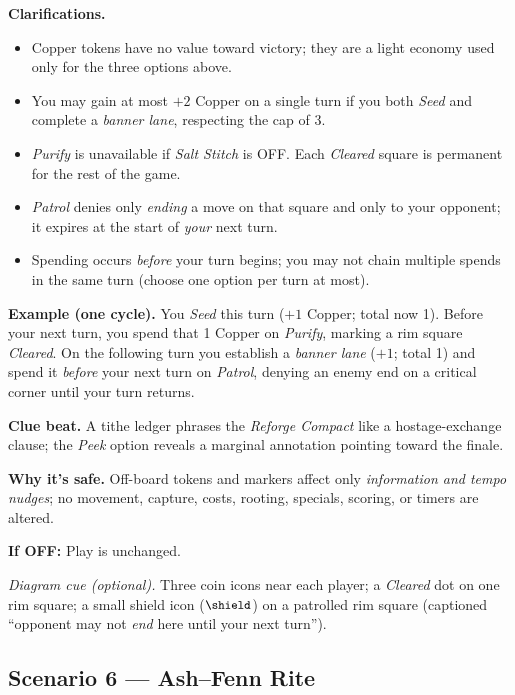 \documentclass[11pt]{article}
\numberwithin{equation}{section} %
\theoremstyle{plain} %
\theoremstyle{definition} %
\theoremstyle{remark} %
\begin{document}
\medskip
\noindent\textbf{Clarifications.}
\begin{itemize}\setlength\itemsep{0.25em}
  \item Copper tokens have no value toward victory; they are a light economy used only for the three options above.
  \item You may gain at most \(+2\) Copper on a single turn if you both \emph{Seed} and complete a \emph{banner lane}, respecting the cap of 3.
  \item \textit{Purify} is unavailable if \emph{Salt Stitch} is \textsc{OFF}. Each \emph{Cleared} square is permanent for the rest of the game.
  \item \textit{Patrol} denies only \emph{ending} a move on that square and only to your opponent; it expires at the start of \emph{your} next turn.
  \item Spending occurs \emph{before} your turn begins; you may not chain multiple spends in the same turn (choose one option per turn at most).
\end{itemize}

\medskip
\noindent\textbf{Example (one cycle).}  
You \emph{Seed} this turn (\(+1\) Copper; total now 1). Before your next turn, you spend that 1 Copper on \emph{Purify}, marking a rim square \emph{Cleared}. On the following turn you establish a \emph{banner lane} (\(+1\); total 1) and spend it \emph{before} your next turn on \emph{Patrol}, denying an enemy end on a critical corner until your turn returns.

\medskip
\noindent\textbf{Clue beat.} A tithe ledger phrases the \emph{Reforge Compact} like a hostage-exchange clause; the \emph{Peek} option reveals a marginal annotation pointing toward the finale.

\medskip
\noindent\textbf{Why it’s safe.} Off-board tokens and markers affect only \emph{information and tempo nudges}; no movement, capture, costs, rooting, specials, scoring, or timers are altered.

\medskip
\noindent\textbf{If \textsc{OFF}:} Play is unchanged.

\medskip
\noindent\textit{Diagram cue (optional).} Three coin icons near each player; a \emph{Cleared} dot on one rim square; a small shield icon (\(\small\shield\)) on a patrolled rim square (captioned “opponent may not \emph{end} here until your next turn”).

\subsection{Scenario 6 — Ash–Fenn Rite}
\label{scen:ash-fenn-rite}
\end{document}
